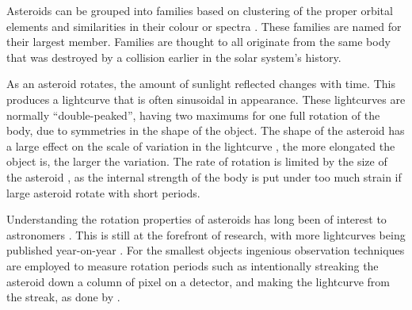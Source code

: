 \documentclass{UCreport}
\begin{document}


Asteroids can be grouped into families based on clustering of the proper orbital elements and similarities in their colour or spectra \citep{Nesvorny2015}.
These families are named for their largest member.
Families are thought to all originate from the same body that was destroyed by a collision earlier in the solar system's history.

As an asteroid rotates, the amount of sunlight reflected changes with time.
This produces a lightcurve that is often sinusoidal in appearance.
These lightcurves are normally ``double-peaked'', having two maximums for one full rotation of the body, due to symmetries in the shape of the object.
The shape of the asteroid has a large effect on the scale of variation in the lightcurve \citep{Durech2015}, the more elongated the object is, the larger the variation.
The rate of rotation is limited by the size of the asteroid \citep{Pravec2000}, as the internal strength of the body is put under too much strain if large asteroid rotate with short periods.

Understanding the rotation properties of asteroids has long been of interest to astronomers \citep[e.g.][for early work into the limits of rotation period and the tumbling nature of some small bodies]{Weidenschilling1981,Harris1994}.
This is still at the forefront of research, with more lightcurves being published year-on-year \citep{Harris2015}.
For the smallest objects ingenious observation techniques are employed to measure rotation periods such as intentionally streaking the asteroid down a column of pixel on a detector, and making the lightcurve from the streak, as done by \citet{Bolin2023}.
\end{document}
